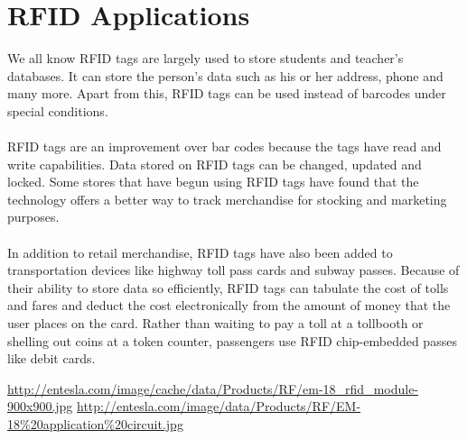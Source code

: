 \documentclass[a4paper,29.6pt]{article}
\begin{document}
\section{RFID Applications}
\begin{small}
We all know RFID tags are largely used to store students and teacher’s databases. It can store the person’s data such as his or her address, phone and many more. Apart from this, RFID tags can be used instead of barcodes under special conditions.\\\\
RFID tags are an improvement over bar codes because the tags have read and write capabilities. Data stored on RFID tags can be changed, updated and locked. Some stores that have begun using RFID tags have found that the technology offers a better way to track merchandise for stocking and marketing purposes.\\\\
In addition to retail merchandise, RFID tags have also been added to transportation devices like highway toll pass cards and subway passes. Because of their ability to store data so efficiently, RFID tags can tabulate the cost of tolls and fares and deduct the cost electronically from the amount of money that the user places on the card. Rather than waiting to pay a toll at a tollbooth or shelling out coins at a token counter, passengers use RFID chip-embedded passes like debit cards.

\end{small}

\newpage
\begin{thebibliography}{99}
 \url{http://entesla.com/image/cache/data/Products/RF/em-18\_rfid\_module-900x900.jpg}
\url{http://entesla.com/image/data/Products/RF/EM-18\%20application%20circuit.jpg}

\end{thebibliography}
\end{document}
